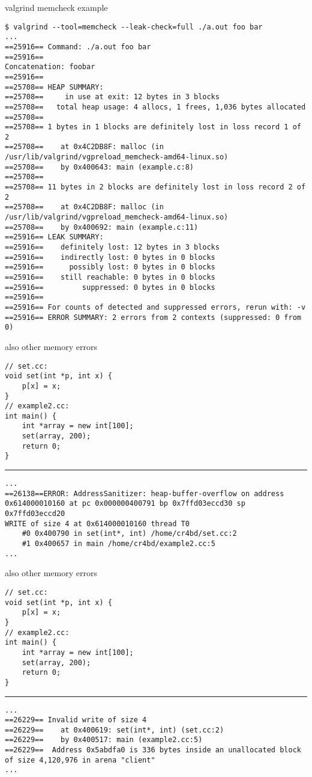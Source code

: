 \begin{frame}[fragile,label=memcheckEx]{valgrind memcheck example}
\begin{lstlisting}
$ valgrind --tool=memcheck --leak-check=full ./a.out foo bar
...
==25916== Command: ./a.out foo bar
==25916== 
Concatenation: foobar
==25916== 
==25708== HEAP SUMMARY:
==25708==     in use at exit: 12 bytes in 3 blocks
==25708==   total heap usage: 4 allocs, 1 frees, 1,036 bytes allocated
==25708== 
==25708== 1 bytes in 1 blocks are definitely lost in loss record 1 of 2
==25708==    at 0x4C2DB8F: malloc (in /usr/lib/valgrind/vgpreload_memcheck-amd64-linux.so)
==25708==    by 0x400643: main (example.c:8)
==25708== 
==25708== 11 bytes in 2 blocks are definitely lost in loss record 2 of 2
==25708==    at 0x4C2DB8F: malloc (in /usr/lib/valgrind/vgpreload_memcheck-amd64-linux.so)
==25708==    by 0x400692: main (example.c:11)
==25916== LEAK SUMMARY:
==25916==    definitely lost: 12 bytes in 3 blocks
==25916==    indirectly lost: 0 bytes in 0 blocks
==25916==      possibly lost: 0 bytes in 0 blocks
==25916==    still reachable: 0 bytes in 0 blocks
==25916==         suppressed: 0 bytes in 0 blocks
==25916== 
==25916== For counts of detected and suppressed errors, rerun with: -v
==25916== ERROR SUMMARY: 2 errors from 2 contexts (suppressed: 0 from 0)
\end{lstlisting}
\end{frame}

\begin{frame}[fragile,label=otherErrorsASAN]{also other memory errors}
\lstset{language=C++,style=smaller}
\begin{lstlisting}
// set.cc:
void set(int *p, int x) {
    p[x] = x;
}
// example2.cc:
int main() {
    int *array = new int[100];
    set(array, 200);
    return 0;
}
\end{lstlisting}
\hrule
{}
\begin{lstlisting}
...
==26138==ERROR: AddressSanitizer: heap-buffer-overflow on address 0x614000010160 at pc 0x000000400791 bp 0x7ffd03eccd30 sp 0x7ffd03eccd20
WRITE of size 4 at 0x614000010160 thread T0
    #0 0x400790 in set(int*, int) /home/cr4bd/set.cc:2
    #1 0x400657 in main /home/cr4bd/example2.cc:5
...
\end{lstlisting}
\end{frame}

\begin{frame}[fragile,label=otherErrorsValgrind]{also other memory errors}
\lstset{language=C++,style=smaller}
\begin{lstlisting}
// set.cc:
void set(int *p, int x) {
    p[x] = x;
}
// example2.cc:
int main() {
    int *array = new int[100];
    set(array, 200);
    return 0;
}
\end{lstlisting}
\hrule
{}
\begin{lstlisting}
...
==26229== Invalid write of size 4
==26229==    at 0x400619: set(int*, int) (set.cc:2)
==26229==    by 0x400517: main (example2.cc:5)
==26229==  Address 0x5abdfa0 is 336 bytes inside an unallocated block of size 4,120,976 in arena "client"
...
\end{lstlisting}
\end{frame}

